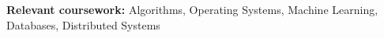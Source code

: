 \textbf{Relevant coursework:} Algorithms, Operating Systems, Machine Learning, Databases, Distributed Systems
